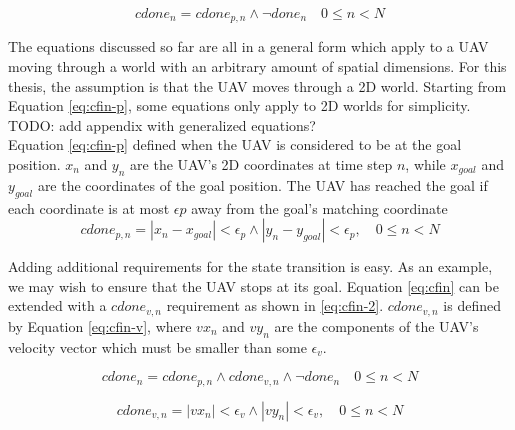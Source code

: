 \begin{equation}
\label{eq:cfin}
cdone_n =  cdone_{p,n} \wedge \neg done_n\quad 0 \leq n < N
\end{equation}

The equations discussed so far are all in a general form which apply to a UAV moving through a world with an arbitrary amount of spatial dimensions. For this thesis, the assumption is that the UAV moves through a 2D world. Starting from Equation \ref{eq:cfin-p}, some equations only apply to 2D worlds for simplicity. TODO: add appendix with generalized equations? \\
Equation \ref{eq:cfin-p} defined when the UAV is considered to be at the goal position. $x_n$ and $y_n$ are the UAV's 2D coordinates at time step $n$, while $x_{goal}$ and $y_{goal}$ are the coordinates of the goal position. The UAV has reached the goal if each coordinate is at most $\epsilon{p}$ away from the goal's matching coordinate
\begin{equation}
\label{eq:cfin-p}
cdone_{p,n} = |x_{n} - x_{goal}| < \epsilon_{p} \wedge  |y_{n} - y_{goal}| < \epsilon_{p}, \quad 0 \leq n < N
\end{equation}

Adding additional requirements for the state transition is easy. As an example, we may wish to ensure that the UAV stops at its goal. Equation \ref{eq:cfin} can be extended with a $cdone_{v,n}$ requirement as shown in \ref{eq:cfin-2}. $cdone_{v,n}$ is defined by Equation \ref{eq:cfin-v}, where $vx_n$ and $vy_n$ are the components of the UAV's velocity vector which must be smaller than some $\epsilon_v$.

\begin{equation}
\label{eq:cfin-2}
cdone_n =  cdone_{p,n} \wedge cdone_{v,n} \wedge \neg done_n\quad 0 \leq n < N
\end{equation}

\begin{equation}
\label{eq:cfin-v}
cdone_{v,n} = |vx_{n}| < \epsilon_{v} \wedge  |vy_{n}| < \epsilon_{v}, \quad 0 \leq n < N
\end{equation}
